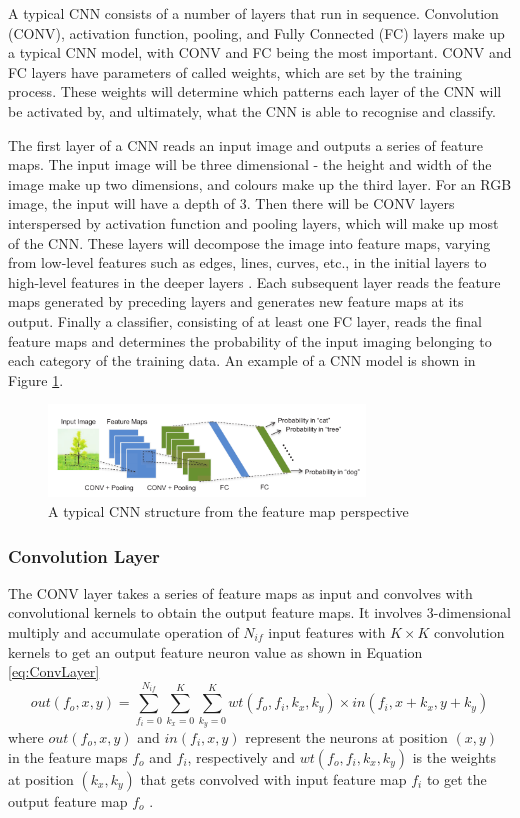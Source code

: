 \documentclass[12pt]{article}
\begin{document}
A typical CNN consists of a number of layers that run in sequence. Convolution (CONV), activation function, pooling, and Fully Connected (FC) layers make up a typical CNN model, with CONV and FC being the most important. CONV and FC layers have parameters of called weights, which are set by the training process. These weights will determine which patterns each layer of the CNN will be activated by, and ultimately, what the CNN is able to recognise and classify. 

The first layer of a CNN reads an input image and outputs a series of feature maps. The input image will be three dimensional - the height and width of the image make up two dimensions, and colours make up the third layer. For an RGB image, the input will have a depth of 3. Then there will be CONV layers interspersed by activation function and pooling layers, which will make up most of the CNN. These layers will decompose the image into feature maps, varying from low-level features such as edges, lines, curves, etc., in the initial layers to high-level features in the deeper layers \cite{SudaFpgaAccelerator}. Each subsequent layer reads the feature maps generated by preceding layers and generates new feature maps at its output. Finally a classifier, consisting of at least one FC layer, reads the final feature maps and determines the probability of the input imaging belonging to each category of the training data. An example of a CNN model is shown in Figure \ref{fig:typicalCNN}.
\begin{figure}[h]
\centering
\includegraphics[width=0.75\textwidth]{../figures/typicalCnn}
\caption{A typical CNN structure from the feature map perspective \cite{embeddedFpgaCnn} \label{fig:typicalCNN}}
\end{figure}


\subsubsection{Convolution Layer}
\label{sec:Background-CNN-Conv}


The CONV layer takes a series of feature maps as input and convolves with convolutional kernels to obtain the output feature maps. It involves 3-dimensional multiply and accumulate operation of $N_{if}$ input features with $K\times K$ convolution kernels to get an output feature neuron value as shown in Equation \ref{eq:ConvLayer}
\begin{equation}
out(f_o,x,y)=\sum^{N_{if}}_{f_i=0} \sum^{K}_{k_x=0} \sum^{K}_{k_y=0} wt(f_o,f_i,k_x,k_y)\times in(f_i,x+k_x,y+k_y)
\label{eq:ConvLayer}
\end{equation}
where $out(f_o,x,y)$ and $in(f_i,x,y)$ represent the neurons at position $(x,y)$ in the feature maps $f_o$ and $f_i$, respectively and $wt(f_o,f_i,k_x,k_y)$ is the weights at position $(k_x,k_y)$ that gets convolved with input feature map $f_i$ to get the output feature map $f_o$ \cite{SudaFpgaAccelerator}.
\end{document}
